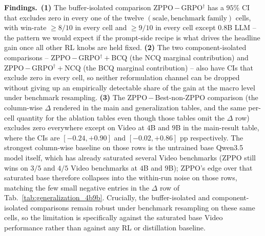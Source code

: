 \documentclass{llmxive}
\begin{document}
\textbf{Findings.}~\textbf{(1)} The buffer-isolated comparison ZPPO\,$-$\,GRPO$^{\dagger}$ has a $95$\% CI that excludes zero in every one of the twelve $(\text{scale}, \text{benchmark family})$ cells, with win-rate $\geq\!8/10$ in every cell and $\geq\!9/10$ in every cell except $0.8$B LLM -- the pattern we would expect if the prompt-side recipe is what drives the headline gain once all other RL knobs are held fixed. \textbf{(2)} The two component-isolated comparisons -- ZPPO\,$-$\,GRPO$^{\dagger}\!+\!$BCQ (the NCQ marginal contribution) and ZPPO\,$-$\,GRPO$^{\dagger}\!+\!$NCQ (the BCQ marginal contribution) -- also have CIs that exclude zero in every cell, so neither reformulation channel can be dropped without giving up an empirically detectable share of the gain at the macro level under benchmark resampling. \textbf{(3)} The ZPPO\,$-$\,Best-non-ZPPO comparison (the column-wise $\Delta$ rendered in the main and generalization tables, and the same per-cell quantity for the ablation tables even though those tables omit the $\Delta$ row) excludes zero everywhere except on Video at $4$B and $9$B in the main-result table, where the CIs are $[-0.24, +0.90]$ and $[-0.02, +0.86]$ pp respectively. The strongest column-wise baseline on those rows is the untrained base Qwen3.5 model itself, which has already saturated several Video benchmarks (ZPPO still wins on $3/5$ and $4/5$ Video benchmarks at $4$B and $9$B); ZPPO's edge over that saturated base therefore collapses into the within-run noise on those rows, matching the few small negative entries in the $\Delta$ row of Tab.~\ref{tab:generalization_4b9b}. Crucially, the buffer-isolated and component-isolated comparisons remain robust under benchmark resampling on these same cells, so the limitation is specifically against the saturated base Video performance rather than against any RL or distillation baseline.
\end{document}
